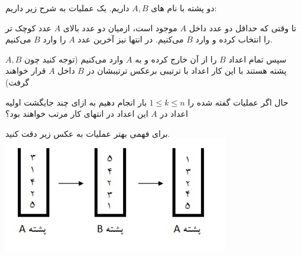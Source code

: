 \begin{PROBLEM}
	\p
	دو پشته با نام های 
	$A, B$
	داریم. یک عملیات به شرح زیر داریم:

	تا وقتی که حداقل دو عدد داخل 
	$A$
	موجود است، ازمیان دو عدد بالای 
	$A$
	عدد کوچک تر را انتخاب کرده و وارد 
	$B$
	می‌کنیم.
	در انتها نیز آخرین عدد 
	$A$
	را وارد
	$B$
	می‌کنیم.

	سپس تمام اعداد 
	$B$
	را از آن خارج کرده و به 
	$A$
	وارد می‌کنیم (توجه کنید چون 
	$A, B$
	پشته هستند با این کار اعداد با ترتیبی برعکس ترتیبشان در 
	$B$
	داخل
	$A$
	قرار خواهند گرفت)

	حال اگر عملیات گفته شده را 
	$1 \leq k \leq n$
	بار انجام دهیم به ازای چند جایگشت اولیه اعداد در 
	$A$
	این اعداد در انتهای کار مرتب خواهند بود؟

	برای فهمی بهتر عملیات به عکس زیر دقت کنید.
	\includegraphics{18.jpg}
	
	\SOLUTION{
		\p

	}
\end{PROBLEM}